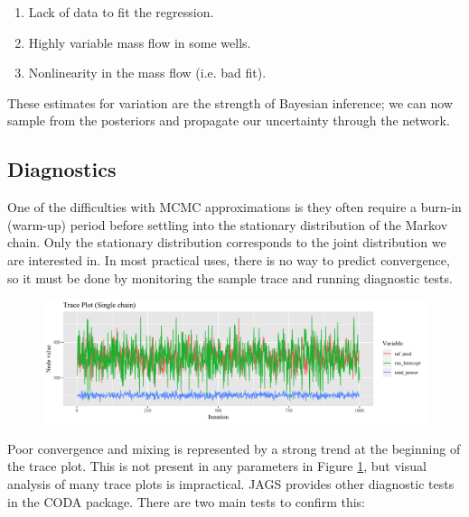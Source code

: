 \documentclass[a4paper, 12pt]{article}
\begin{document}
\begin{enumerate}
\item Lack of data to fit the regression.
\item Highly variable mass flow in some wells.
\item Nonlinearity in the mass flow (i.e. bad fit).
\end{enumerate}

These estimates for variation are the strength of Bayesian inference; we can now sample from the posteriors and propagate our uncertainty through the network.

\subsection{Diagnostics}
One of the difficulties with MCMC approximations is they often require a burn-in (warm-up) period before settling into the stationary distribution of the Markov chain. Only the stationary distribution corresponds to the joint distribution we are interested in. In most practical uses, there is no way to predict convergence, so it must be done by monitoring the sample trace and running diagnostic tests.

\begin{figure}
\centering
  \includegraphics[width=\linewidth]{media/trace_plot}
  \label{fig:trace_plot}
\end{figure}

Poor convergence and mixing is represented by a strong trend at the beginning of the trace plot. This is not present in any parameters in Figure \ref{fig:trace_plot}, but visual analysis of many trace plots is impractical.
JAGS provides other diagnostic tests in the CODA package. There are two main tests to confirm this:
\end{document}
